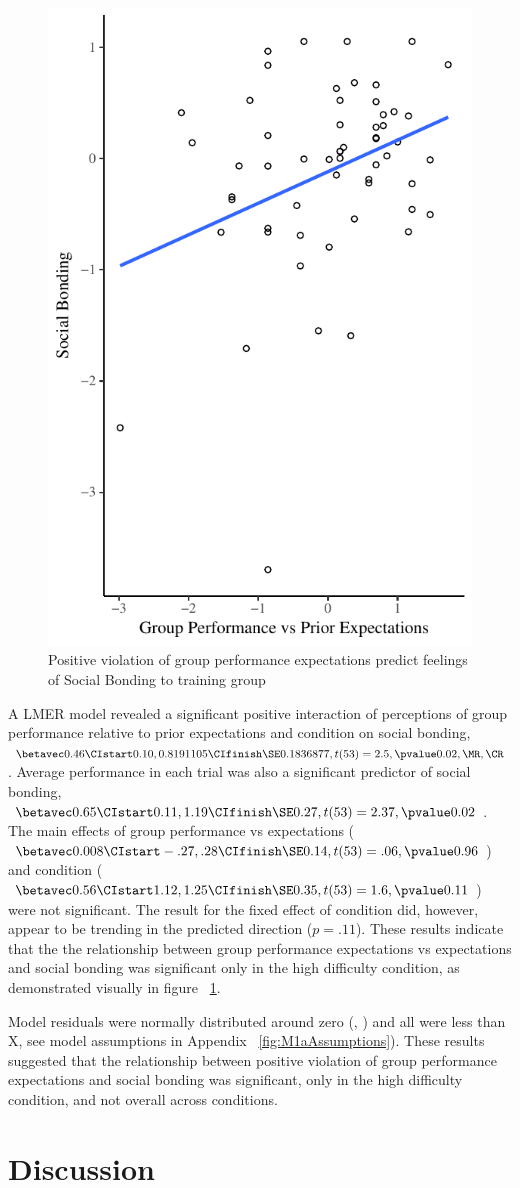 \begin{figure}
  \centering
  \includegraphics[width=0.5\linewidth,keepaspectratio] {images/groupPerfExpBondConditionScatter}
  \caption{Positive violation of group performance expectations
 predict feelings of Social Bonding to training group}
 \label{fig:groupPerfExpBondConditionScatter}
\end{figure}

A LMER model revealed a significant positive interaction of perceptions of group performance relative to prior expectations and condition on social bonding, $\betavec 0.46 \CIstart 0.10, 0.8191105 \CIfinish \SE 0.1836877, t(53) = 2.5, \pvalue 0.02, \MR , \CR $.  Average performance in each trial was also a significant predictor of social bonding, $\betavec 0.65 \CIstart 0.11, 1.19 \CIfinish \SE 0.27, t(53) = 2.37, \pvalue 0.02$.
The main effects of group performance vs expectations ($\betavec 0.008 \CIstart -.27, .28 \CIfinish \SE 0.14, t(53) = .06, \pvalue 0.96$) and condition ($\betavec 0.56 \CIstart 1.12, 1.25 \CIfinish \SE 0.35, t(53) = 1.6, \pvalue 0.11$) were not significant. The result for the fixed effect of condition did, however, appear to be trending in the predicted direction ($p = .11$). These results indicate that the the relationship between group performance expectations vs expectations and social bonding was significant only in the high difficulty condition, as demonstrated visually in figure ~\ref{fig:groupPerfExpBondConditionScatter}.

Model residuals were normally distributed around zero (, ) and all \cooksD were less than X, see model assumptions in Appendix  ~\ref{fig:M1aAssumptions}).  These results suggested that the relationship between positive violation of group performance expectations and social bonding was significant, only in the high difficulty condition, and not overall across conditions.









\section{Discussion}
